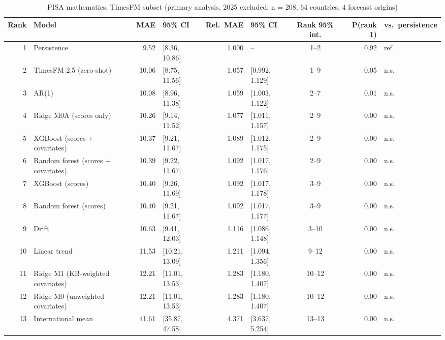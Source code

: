 \begin{table}[htbp]
\centering
\footnotesize
\caption{PISA mathematics, TimesFM subset (primary analysis, 2025 excluded; n = 208, 64 countries, 4 forecast origins)}
\label{tab:A10}
\begin{tabular}{rlrlrlcrl}
\toprule
Rank & Model & MAE & 95\% CI & Rel.\ MAE & 95\% CI & Rank 95\% int. & P(rank 1) & vs.\ persistence \\
\midrule
1 & Persistence & 9.52 & [8.36, 10.86] & 1.000 & -- & 1--2 & 0.92 & ref. \\
2 & TimesFM 2.5 (zero-shot) & 10.06 & [8.75, 11.56] & 1.057 & [0.992, 1.129] & 1--9 & 0.05 & n.s. \\
3 & AR(1) & 10.08 & [8.96, 11.38] & 1.059 & [1.003, 1.122] & 2--7 & 0.01 & n.s. \\
4 & Ridge M0A (scores only) & 10.26 & [9.14, 11.52] & 1.077 & [1.011, 1.157] & 2--9 & 0.00 & n.s. \\
5 & XGBoost (scores + covariates) & 10.37 & [9.21, 11.67] & 1.089 & [1.012, 1.175] & 2--9 & 0.00 & n.s. \\
6 & Random forest (scores + covariates) & 10.39 & [9.22, 11.67] & 1.092 & [1.017, 1.176] & 2--9 & 0.00 & n.s. \\
7 & XGBoost (scores) & 10.40 & [9.26, 11.69] & 1.092 & [1.017, 1.178] & 3--9 & 0.00 & n.s. \\
8 & Random forest (scores) & 10.40 & [9.21, 11.67] & 1.092 & [1.017, 1.177] & 3--9 & 0.00 & n.s. \\
9 & Drift & 10.63 & [9.41, 12.03] & 1.116 & [1.086, 1.148] & 3--10 & 0.00 & n.s. \\
10 & Linear trend & 11.53 & [10.21, 13.09] & 1.211 & [1.094, 1.356] & 9--12 & 0.00 & n.s. \\
11 & Ridge M1 (KB-weighted covariates) & 12.21 & [11.01, 13.53] & 1.283 & [1.180, 1.407] & 10--12 & 0.00 & n.s. \\
12 & Ridge M0 (unweighted covariates) & 12.21 & [11.01, 13.53] & 1.283 & [1.180, 1.407] & 10--12 & 0.00 & n.s. \\
13 & International mean & 41.61 & [35.87, 47.58] & 4.371 & [3.637, 5.254] & 13--13 & 0.00 & n.s. \\
\bottomrule
\end{tabular}
\par{}
\end{table}
